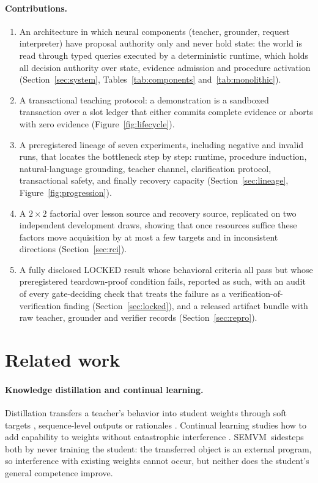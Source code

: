 \documentclass[10pt]{article}
\newcommand{\semvm}{SEMVM}
\begin{document}
\paragraph{Contributions.}
\begin{enumerate}
\item An architecture in which neural components (teacher, grounder, request interpreter) have proposal authority only and never hold state: the world is read through typed queries executed by a deterministic runtime, which holds all decision authority over state, evidence admission and procedure activation (Section~\ref{sec:system}, Tables~\ref{tab:components} and~\ref{tab:monolithic}).
\item A transactional teaching protocol: a demonstration is a sandboxed transaction over a slot ledger that either commits complete evidence or aborts with zero evidence (Figure~\ref{fig:lifecycle}).
\item A preregistered lineage of seven experiments, including negative and invalid runs, that locates the bottleneck step by step: runtime, procedure induction, natural-language grounding, teacher channel, clarification protocol, transactional safety, and finally recovery capacity (Section~\ref{sec:lineage}, Figure~\ref{fig:progression}).
\item A $2\times2$ factorial over lesson source and recovery source, replicated on two independent development draws, showing that once resources suffice these factors move acquisition by at most a few targets and in inconsistent directions (Section~\ref{sec:rci}).
\item A fully disclosed LOCKED result whose behavioral criteria all pass but whose preregistered teardown-proof condition fails, reported as such, with an audit of every gate-deciding check that treats the failure as a verification-of-verification finding (Section~\ref{sec:locked}), and a released artifact bundle with raw teacher, grounder and verifier records (Section~\ref{sec:repro}).
\end{enumerate}

\section{Related work}\label{sec:related}

\paragraph{Knowledge distillation and continual learning.} Distillation transfers a teacher's behavior into student weights through soft targets \citep{hinton2015distilling}, sequence-level outputs \citep{kim2016sequence} or rationales \citep{hsieh2023distilling}. Continual learning studies how to add capability to weights without catastrophic interference \citep{mccloskey1989catastrophic, kirkpatrick2017ewc}. \semvm\ sidesteps both by never training the student: the transferred object is an external program, so interference with existing weights cannot occur, but neither does the student's general competence improve.
\end{document}
